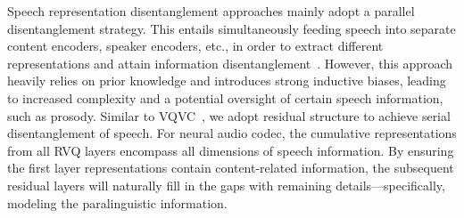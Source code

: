 
% 



Speech representation disentanglement approaches mainly adopt a parallel disentanglement strategy. This entails simultaneously feeding speech into separate content encoders, speaker encoders, etc., in order to extract different representations and attain information disentanglement~\citep{qian2020unsupervised, polyak2021speech}. However, this approach heavily relies on prior knowledge and introduces strong inductive biases, leading to increased complexity and a potential oversight of certain speech information, such as prosody.
Similar to VQVC~\citep{wu2020one}, we adopt residual structure to achieve serial disentanglement of speech. For neural 
audio codec, the cumulative representations from all RVQ layers encompass all dimensions of speech information. By ensuring the first layer representations contain content-related information, the subsequent residual layers will naturally fill in the gaps with remaining details—specifically, modeling the paralinguistic information.

